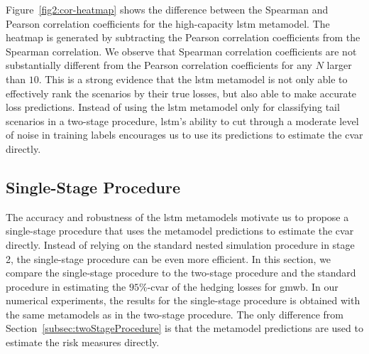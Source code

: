 Figure~\ref{fig2:cor-heatmap} shows the difference between the Spearman and Pearson correlation coefficients for the high-capacity \gls{lstm} metamodel.
The heatmap is generated by subtracting the Pearson correlation coefficients from the Spearman correlation.
We observe that Spearman correlation coefficients are not substantially different from the Pearson correlation coefficients for any $N$ larger than $\num{10}$. 
This is a strong evidence that the \gls{lstm} metamodel is not only able to effectively rank the scenarios by their true losses, but also able to make accurate loss predictions.
Instead of using the \gls{lstm} metamodel only for classifying tail scenarios in a two-stage procedure, \gls{lstm}'s ability to cut through a moderate level of noise in training labels encourages us to use its predictions to estimate the \gls{cvar} directly. 

\subsection{Single-Stage Procedure}

The accuracy and robustness of the \gls{lstm} metamodels motivate us to propose a single-stage procedure that uses the metamodel predictions to estimate the \gls{cvar} directly. 
Instead of relying on the standard nested simulation procedure in stage 2, the single-stage procedure can be even more efficient.
In this section, we compare the single-stage procedure to the two-stage procedure and the standard procedure in estimating the $95\%$-\gls{cvar} of the hedging losses for \gls{gmwb}.
In our numerical experiments, the results for the single-stage procedure is obtained with the same metamodels as in the two-stage procedure.
The only difference from Section~\ref{subsec:twoStageProcedure} is that the metamodel predictions are used to estimate the risk measures directly.

